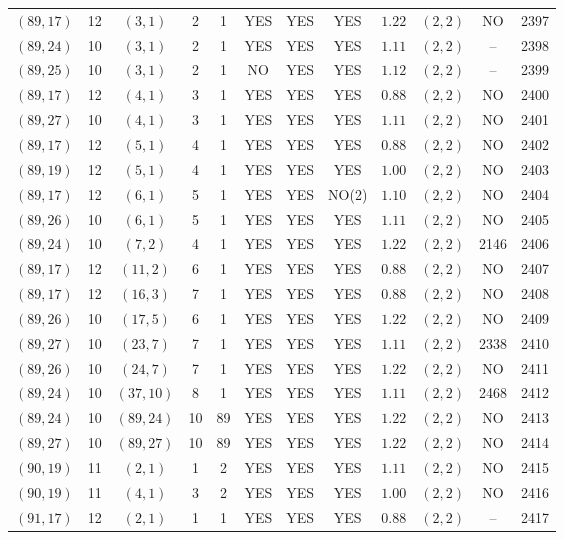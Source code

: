 \begin{longtable}{|c|c|c|c|c|c|c|c|c|c|c|c|}
$(89,17)$ & 12 & $(3,1)$ & 2 & 1 & YES & YES & YES & $1.22$ & $(2,2)$ & NO & 2397\\
$(89,24)$ & 10 & $(3,1)$ & 2 & 1 & YES & YES & YES & $1.11$ & $(2,2)$ & -- & 2398\\
$(89,25)$ & 10 & $(3,1)$ & 2 & 1 & NO & YES & YES & $1.12$ & $(2,2)$ & -- & 2399\\
$(89,17)$ & 12 & $(4,1)$ & 3 & 1 & YES & YES & YES & $0.88$ & $(2,2)$ & NO & 2400\\
$(89,27)$ & 10 & $(4,1)$ & 3 & 1 & YES & YES & YES & $1.11$ & $(2,2)$ & NO & 2401\\
$(89,17)$ & 12 & $(5,1)$ & 4 & 1 & YES & YES & YES & $0.88$ & $(2,2)$ & NO & 2402\\
$(89,19)$ & 12 & $(5,1)$ & 4 & 1 & YES & YES & YES & $1.00$ & $(2,2)$ & NO & 2403\\
$(89,17)$ & 12 & $(6,1)$ & 5 & 1 & YES & YES & NO(2) & $1.10$ & $(2,2)$ & NO & 2404\\
$(89,26)$ & 10 & $(6,1)$ & 5 & 1 & YES & YES & YES & $1.11$ & $(2,2)$ & NO & 2405\\
$(89,24)$ & 10 & $(7,2)$ & 4 & 1 & YES & YES & YES & $1.22$ & $(2,2)$ & 2146 & 2406\\
$(89,17)$ & 12 & $(11,2)$ & 6 & 1 & YES & YES & YES & $0.88$ & $(2,2)$ & NO & 2407\\
$(89,17)$ & 12 & $(16,3)$ & 7 & 1 & YES & YES & YES & $0.88$ & $(2,2)$ & NO & 2408\\
$(89,26)$ & 10 & $(17,5)$ & 6 & 1 & YES & YES & YES & $1.22$ & $(2,2)$ & NO & 2409\\
$(89,27)$ & 10 & $(23,7)$ & 7 & 1 & YES & YES & YES & $1.11$ & $(2,2)$ & 2338 & 2410\\
$(89,26)$ & 10 & $(24,7)$ & 7 & 1 & YES & YES & YES & $1.22$ & $(2,2)$ & NO & 2411\\
$(89,24)$ & 10 & $(37,10)$ & 8 & 1 & YES & YES & YES & $1.11$ & $(2,2)$ & 2468 & 2412\\
$(89,24)$ & 10 & $(89,24)$ & 10 & 89 & YES & YES & YES & $1.22$ & $(2,2)$ & NO & 2413\\
$(89,27)$ & 10 & $(89,27)$ & 10 & 89 & YES & YES & YES & $1.22$ & $(2,2)$ & NO & 2414\\
$(90,19)$ & 11 & $(2,1)$ & 1 & 2 & YES & YES & YES & $1.11$ & $(2,2)$ & NO & 2415\\
$(90,19)$ & 11 & $(4,1)$ & 3 & 2 & YES & YES & YES & $1.00$ & $(2,2)$ & NO & 2416\\
$(91,17)$ & 12 & $(2,1)$ & 1 & 1 & YES & YES & YES & $0.88$ & $(2,2)$ & -- & 2417\\

\end{longtable}
